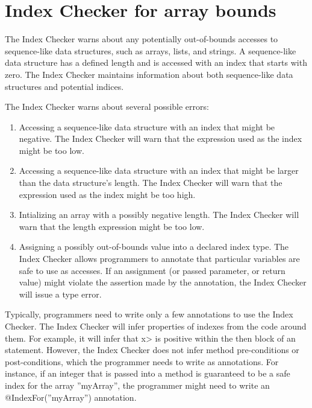 \chapter{Index Checker for array bounds\label{index-checker}}

The Index Checker warns about any potentially out-of-bounds accesses to sequence-like
data structures, such as arrays, lists, and strings. A sequence-like data structure
has a defined length and is accessed with an index that starts with zero. The Index Checker maintains
information about both sequence-like data structures and potential indices.

The Index Checker warns about several possible errors:

\begin{enumerate}
\item Accessing a sequence-like data structure with an index that
  might be negative. The Index Checker will warn that the expression
  used as the index might be too low.
\item Accessing a sequence-like data structure with an index
  that might be larger than the data structure's length. The Index
  Checker will warn that the expression used as the index might be
  too high.
\item Intializing an array with a possibly negative length. The Index
  Checker will warn that the length expression might be too low.
\item Assigning a possibly out-of-bounds value into a declared
  index type. The Index Checker allows programmers to annotate
  that particular variables are safe to use as accesses. If an
  assignment (or passed parameter, or return value) might violate
  the assertion made by the annotation, the Index Checker will
  issue a type error.

  \end{enumerate}

Typically, programmers need to write only a few annotations to use the
Index Checker. The Index Checker will infer properties of indexes from
the code around them. For example, it will infer that \<x> is positive
within the then block of an  statement. However, the
Index Checker does not infer method pre-conditions or post-conditions,
which the programmer needs to write as annotations. For instance,
if an integer that is passed into a method is guaranteed to be a safe
index for the array ''myArray'', the programmer might need to
write an @IndexFor(''myArray'') annotation.


